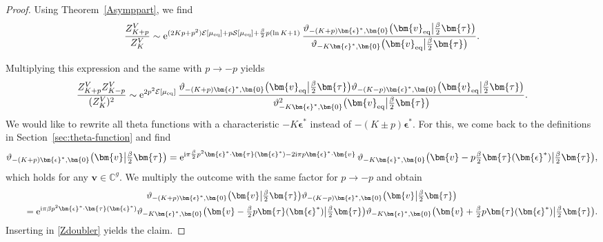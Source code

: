 \documentclass[pdftex]{sigma}
\numberwithin{equation}{section}
\begin{document}
\begin{proof}
Using Theorem~\ref{Asymppart}, we find
\[
\frac{Z_{K + p}^{V}}{Z_K^V} \sim{\rm e}^{(2Kp + p^2)\mathcal{E}[\mu_{{\rm eq}}] + p \mathcal{S}[\mu_{{\rm eq}}] + \frac{\beta}{2}p(\ln K + 1)}\,\frac{\vartheta_{-(K + p)\bm{\epsilon}^*,\bm{0}}\bigl(\bm{v}_{{\rm eq}}\big|\frac{\beta}{2}\bm{\tau}\bigr)}{\vartheta_{-K\bm{\epsilon}^*,\bm{0}}\bigl(\bm{v}_{{\rm eq}}\big|\frac{\beta}{2}\bm{\tau}\bigr)}.
\]

Multiplying this expression and the same with $p \rightarrow -p$ yields
\begin{equation}
 \label{Zdoubler}
	\frac{Z_{K + p}^{V}Z_{K - p}^{V}}{(Z_K^V)^2} \sim{\rm e}^{2p^2\mathcal{E}[\mu_{{\rm eq}}]}\,\frac{\vartheta_{-(K + p)\bm{\epsilon}^*,\bm{0}}\bigl(\bm{v}_{{\rm eq}}\big|\frac{\beta}{2}\bm{\tau}\bigr)\vartheta_{-(K - p)\bm{\epsilon}^*,\bm{0}}\bigl(\bm{v}_{{\rm eq}}\big|\frac{\beta}{2}\bm{\tau}\bigr)}{\vartheta^2_{-K\bm{\epsilon}^*,\bm{0}}\bigl(\bm{v}_{{\rm eq}}\big|\frac{\beta}{2}\bm{\tau}\bigr)}.
\end{equation}
We would like to rewrite all theta functions with a characteristic $-K\bm{\epsilon}^*$ instead of $-(K \pm p)\bm{\epsilon}^*$. For this, we come back to the definitions in Section~\ref{sec:theta-function} and find
\begin{equation}
\label{thetashift}
\vartheta_{-(K + p)\bm{\epsilon}^*,\bm{0}}\bigl(\bm{v}\big|\tfrac{\beta}{2}\bm{\tau}\bigr) ={\rm e}^{{\rm i}\pi \frac{\beta}{2} p^2 \bm{\epsilon}^* \cdot \bm{\tau}(\bm{\epsilon}^*) - 2{\rm i}\pi p \bm{\epsilon}^* \cdot \bm{v}}\,\vartheta_{-K\bm{\epsilon}^*,\bm{0}}\bigl(\bm{v} - p\tfrac{\beta}{2}\bm{\tau}(\bm{\epsilon}^*)\big|\tfrac{\beta}{2}\bm{\tau}\bigr),
\end{equation}
which holds for any $\bm{v} \in \mathbb{C}^g$. We multiply the outcome with the same factor for $p \rightarrow -p$ and obtain
\begin{gather*}
 \vartheta_{-(K + p)\bm{\epsilon}^*,\bm{0}}\bigl(\bm{v}\big|\tfrac{\beta}{2}\bm{\tau}\bigr)\vartheta_{-(K - p)\bm{\epsilon}^*,\bm{0}}\bigl(\bm{v}\big|\tfrac{\beta}{2}\bm{\tau}\bigr) \\
\qquad{} ={\rm e}^{{\rm i}\pi \beta p^2 \bm{\epsilon}^* \cdot \bm{\tau}(\bm{\epsilon}^*)}\vartheta_{-K\bm{\epsilon}^*,\bm{0}}\bigl(\bm{v} - \tfrac{\beta}{2}p\bm{\tau}(\bm{\epsilon}^*)\big|\tfrac{\beta}{2}\bm{\tau}\bigr) \vartheta_{-K\bm{\epsilon}^*,\bm{0}}\bigl(\bm{v} + \tfrac{\beta}{2} p \bm{\tau}(\bm{\epsilon}^*)\big|\tfrac{\beta}{2}\bm{\tau}\bigr).
\end{gather*}
Inserting in \eqref{Zdoubler} yields the claim.
\end{proof}
\end{document}
